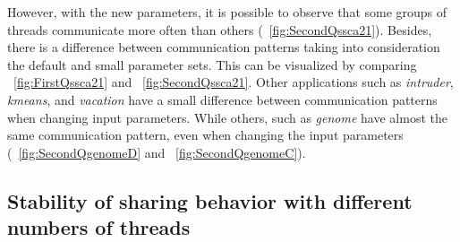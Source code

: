 However, with the new parameters, it is possible to observe that some groups of threads communicate more often than others (\figurename~\ref{fig:SecondQssca21}). Besides, there is a difference between communication patterns taking into consideration the default and small parameter sets. This can be visualized by comparing \figurename~\ref{fig:FirstQssca21} and \figurename~\ref{fig:SecondQssca21}. Other applications such as \emph{intruder}, \emph{kmeans}, and \emph{vacation} have a small difference between communication patterns when changing input parameters. While others, such as \emph{genome} have almost the same communication pattern, even when changing the input parameters (\figurename~\ref{fig:SecondQgenomeD} and \figurename~\ref{fig:SecondQgenomeC}).

\subsection{Stability of sharing behavior with different numbers of threads}\label{sec:differentThreads}

